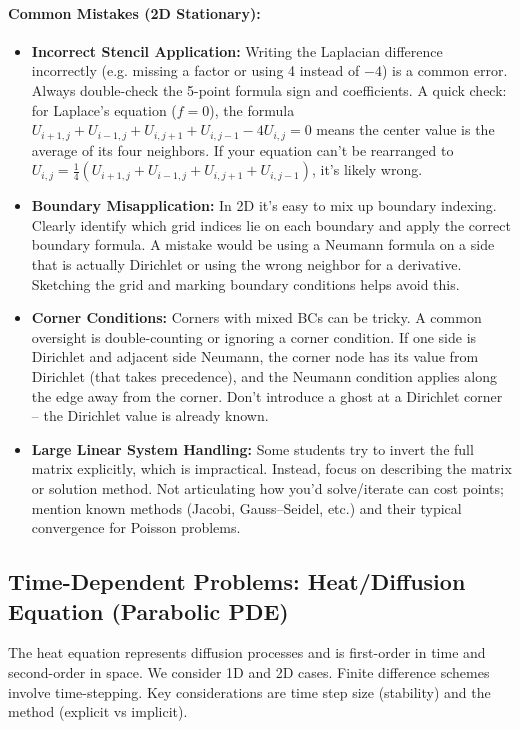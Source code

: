 \documentclass[a4paper,11pt]{article}
\begin{document}
\paragraph{Common Mistakes (2D Stationary):}
\begin{itemize}
    \item \textbf{Incorrect Stencil Application:} Writing the Laplacian difference incorrectly (e.g. missing a factor or using 4 instead of $-4$) is a common error. Always double-check the 5-point formula sign and coefficients. A quick check: for Laplace’s equation ($f=0$), the formula $U_{i+1,j}+U_{i-1,j}+U_{i,j+1}+U_{i,j-1}-4U_{i,j}=0$ means the center value is the average of its four neighbors\cite{leifh}. If your equation can’t be rearranged to $U_{i,j} = \frac{1}{4}(U_{i+1,j}+U_{i-1,j}+U_{i,j+1}+U_{i,j-1})$, it’s likely wrong.
    \item \textbf{Boundary Misapplication:} In 2D it’s easy to mix up boundary indexing. Clearly identify which grid indices lie on each boundary and apply the correct boundary formula. A mistake would be using a Neumann formula on a side that is actually Dirichlet or using the wrong neighbor for a derivative. Sketching the grid and marking boundary conditions helps avoid this.
    \item \textbf{Corner Conditions:} Corners with mixed BCs can be tricky. A common oversight is double-counting or ignoring a corner condition. If one side is Dirichlet and adjacent side Neumann, the corner node has its value from Dirichlet (that takes precedence), and the Neumann condition applies along the edge away from the corner. Don’t introduce a ghost at a Dirichlet corner -- the Dirichlet value is already known.
    \item \textbf{Large Linear System Handling:} Some students try to invert the full matrix explicitly, which is impractical. Instead, focus on describing the matrix or solution method. Not articulating how you’d solve/iterate can cost points; mention known methods (Jacobi, Gauss--Seidel, etc.) and their typical convergence for Poisson problems.
\end{itemize}

\subsection{Time-Dependent Problems: Heat/Diffusion Equation (Parabolic PDE)}
The heat equation represents diffusion processes and is first-order in time and second-order in space. We consider 1D and 2D cases. Finite difference schemes involve time-stepping. Key considerations are time step size (stability) and the method (explicit vs implicit).
\end{document}
